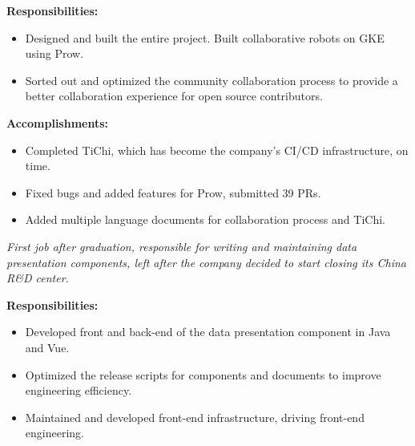 \documentclass{resume}
\newcommand{\en}[1]{#1}
\newcommand{\zh}[1]{}
\begin{document}
\en{\textbf{Responsibilities:}}
\zh{\textbf{职责：}}
\begin{itemize}
      \item \en{Designed and built the entire project. Built collaborative robots on GKE using Prow.}
            \zh{从零开始设计和构建整个项目，使用 Prow 在 GKE 上搭建协作机器人。}
      \item \en{Sorted out and optimized the community collaboration process to provide a better collaboration experience for open source contributors.}
            \zh{负责社区协作流程的梳理和优化，为开源贡献者提供更好的协作体验。}
\end{itemize}

\en{\textbf{Accomplishments:}}
\zh{\textbf{产出：}}
\begin{itemize}
      \item \en{Completed TiChi, which has become the company’s CI/CD infrastructure, on time.}
            \zh{按时完成了项目的设计和开发，TiChi 已经成为了公司 CI/CD 的基础设施。}
      \item \en{Fixed bugs and added features for Prow, submitted 39 PRs.}
            \zh{为 Prow 修复 bug 和添加功能，提交了 39 个 PR。}
      \item \en{Added multiple language documents for collaboration process and TiChi.}
            \zh{为 TiChi 编写了良好的文档，明确了协作流程，为开源贡献者提供了更好的协作体验。}
\end{itemize}

\en{}
\zh{\datedsubsection{\textbf{\href{https://www.morningstar.com/}{晨星资讯（Morningstar, Inc.）- 金融服务 - 前后端开发工程师}}}{2019/06 -- 2020/07}}
\en{\textsl{First job after graduation, responsible for writing and maintaining data presentation components, left after the company decided to start closing its China R\&D center.}}
\zh{\textsl{毕业后第一份工作，负责编写和维护数据展示组件，在公司决定开始关闭中国研发中心后离职。}}

\en{\textbf{Responsibilities:}}
\zh{\textbf{职责：}}
\begin{itemize}
      \item \en{Developed front and back-end of the data presentation component in Java and Vue.}
            \zh{负责数据展示组件的前后端开发，使用 Java 和 Vue 开发。}
      \item \en{Optimized the release scripts for components and documents to improve engineering efficiency.}
            \zh{负责组件和文档发布脚本的优化，提升工程效率。}
      \item \en{Maintained and developed front-end infrastructure, driving front-end engineering.}
            \zh{负责前端基础设施维护和开发，尝试和推动前端工程化。}
\end{itemize}
\end{document}
